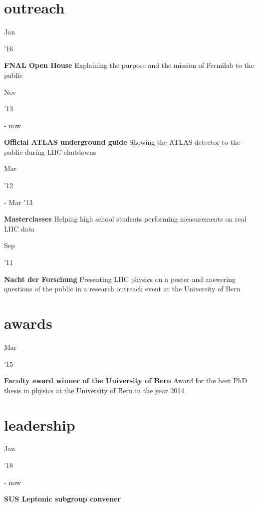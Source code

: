 \documentclass[]{cv} %
\begin{document}
\section{outreach}

\begin{entrylist}

  \entry
  {\parbox[t]{\parboxWidthOne}{Jan}\parbox[t]{\parboxWidthTwo}{\hfill '16}}
  {\textbf{FNAL Open House}}
  {}
  {Explaining the purpose and the mission of Fermilab to the public}

  \entry
  {\parbox[t]{\parboxWidthOne}{Nov}\parbox[t]{\parboxWidthTwo}{\hfill '13} - now}
  {\textbf{Official ATLAS underground guide}}
  {}
  {Showing the ATLAS detector to the public during LHC shutdowns}

  \entry
  {\parbox[t]{\parboxWidthOne}{Mar}\parbox[t]{\parboxWidthTwo}{\hfill '12} - Mar
'13}
  {\textbf{Masterclasses}}
  {}
  {Helping high school students performing measurements on real LHC data}

  \entry
  {\parbox[t]{\parboxWidthOne}{Sep}\parbox[t]{\parboxWidthTwo}{\hfill '11}}
  {\textbf{Nacht der Forschung}}
  {}
  {Presenting LHC physics on a poster and answering questions of the public in a
  research outreach event at the University of Bern}

\end{entrylist}

\section{awards}

\begin{entrylist}

  \entry
  {\parbox[t]{\parboxWidthOne}{Mar} '15}
  {\textbf{Faculty award winner of the University of Bern}}
  {}
  {Award for the best PhD thesis in physics at the University of Bern in the
  year 2014}

\end{entrylist}

\section{leadership}

\begin{entrylist}

  \entry
  {\parbox[t]{\parboxWidthOne}{Jan}\parbox[t]{\parboxWidthTwo}{\hfill '18} - now}
  {\textbf{SUS Leptonic subgroup convener}}
  {}
  {}

\end{entrylist}
\end{document}
